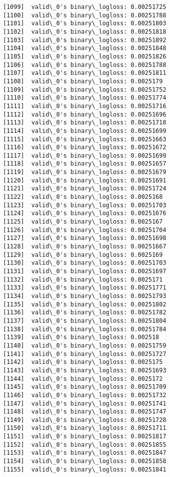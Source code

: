 \documentclass[11pt]{article}
\begin{document}
\begin{Verbatim}[commandchars=\\\{\}]
[1099]	valid\_0's binary\_logloss: 0.00251725
[1100]	valid\_0's binary\_logloss: 0.00251788
[1101]	valid\_0's binary\_logloss: 0.00251803
[1102]	valid\_0's binary\_logloss: 0.00251818
[1103]	valid\_0's binary\_logloss: 0.00251892
[1104]	valid\_0's binary\_logloss: 0.00251848
[1105]	valid\_0's binary\_logloss: 0.00251826
[1106]	valid\_0's binary\_logloss: 0.00251788
[1107]	valid\_0's binary\_logloss: 0.00251811
[1108]	valid\_0's binary\_logloss: 0.0025179
[1109]	valid\_0's binary\_logloss: 0.00251752
[1110]	valid\_0's binary\_logloss: 0.00251774
[1111]	valid\_0's binary\_logloss: 0.00251716
[1112]	valid\_0's binary\_logloss: 0.00251696
[1113]	valid\_0's binary\_logloss: 0.00251718
[1114]	valid\_0's binary\_logloss: 0.00251699
[1115]	valid\_0's binary\_logloss: 0.00251663
[1116]	valid\_0's binary\_logloss: 0.00251672
[1117]	valid\_0's binary\_logloss: 0.00251699
[1118]	valid\_0's binary\_logloss: 0.00251657
[1119]	valid\_0's binary\_logloss: 0.00251679
[1120]	valid\_0's binary\_logloss: 0.00251691
[1121]	valid\_0's binary\_logloss: 0.00251724
[1122]	valid\_0's binary\_logloss: 0.0025168
[1123]	valid\_0's binary\_logloss: 0.00251703
[1124]	valid\_0's binary\_logloss: 0.00251676
[1125]	valid\_0's binary\_logloss: 0.0025167
[1126]	valid\_0's binary\_logloss: 0.00251704
[1127]	valid\_0's binary\_logloss: 0.00251698
[1128]	valid\_0's binary\_logloss: 0.00251667
[1129]	valid\_0's binary\_logloss: 0.0025169
[1130]	valid\_0's binary\_logloss: 0.00251703
[1131]	valid\_0's binary\_logloss: 0.00251697
[1132]	valid\_0's binary\_logloss: 0.0025171
[1133]	valid\_0's binary\_logloss: 0.00251771
[1134]	valid\_0's binary\_logloss: 0.00251793
[1135]	valid\_0's binary\_logloss: 0.00251802
[1136]	valid\_0's binary\_logloss: 0.00251782
[1137]	valid\_0's binary\_logloss: 0.00251804
[1138]	valid\_0's binary\_logloss: 0.00251784
[1139]	valid\_0's binary\_logloss: 0.002518
[1140]	valid\_0's binary\_logloss: 0.00251759
[1141]	valid\_0's binary\_logloss: 0.00251727
[1142]	valid\_0's binary\_logloss: 0.0025175
[1143]	valid\_0's binary\_logloss: 0.00251693
[1144]	valid\_0's binary\_logloss: 0.0025172
[1145]	valid\_0's binary\_logloss: 0.00251709
[1146]	valid\_0's binary\_logloss: 0.00251732
[1147]	valid\_0's binary\_logloss: 0.00251741
[1148]	valid\_0's binary\_logloss: 0.00251747
[1149]	valid\_0's binary\_logloss: 0.00251728
[1150]	valid\_0's binary\_logloss: 0.00251711
[1151]	valid\_0's binary\_logloss: 0.00251817
[1152]	valid\_0's binary\_logloss: 0.00251855
[1153]	valid\_0's binary\_logloss: 0.00251847
[1154]	valid\_0's binary\_logloss: 0.00251858
[1155]	valid\_0's binary\_logloss: 0.00251841

\end{Verbatim}
\end{document}
